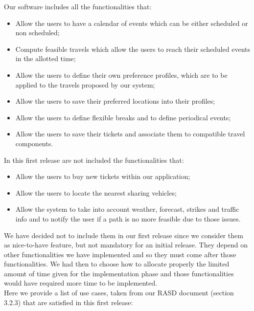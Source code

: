 \noindent Our software includes all the functionalities that:
\begin{itemize}
	\item Allow the users to have a calendar of events which can be either scheduled or non scheduled;
	\item Compute feasible travels which allow the users to reach their scheduled events in the allotted time;
	\item Allow the users to define their own preference profiles, which are to be applied to the travels proposed by our system;
	\item Allow the users to save their preferred locations into their profiles;
	\item Allow the users to define flexible breaks and to define periodical events;
	\item Allow the users to save their tickets and associate them to compatible travel components.
\end{itemize}
\noindent 
In this first release are not included the functionalities that:
\begin{itemize}
	\item Allow the users to buy new tickets within our application;
	\item Allow the users to locate the nearest sharing vehicles;
	\item Allow the system to take into account weather, forecast, strikes and traffic info and to notify the user if a path is no more feasible due to those issues.
\end{itemize} 
We have decided not to include them in our first release since we consider them as nice-to-have feature, but not mandatory for an initial release. They depend on other functionalities we have implemented and so they must come after those functionalities. We had then to choose how to allocate properly the limited amount of time given for the implementation phase and those functionalities would have required more time to be implemented. \\
Here we provide a list of use cases, taken from our RASD document (section 3.2.3) that are satisfied in this first release:

